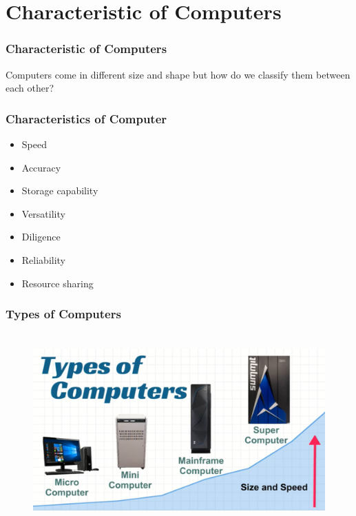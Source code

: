 \section{Characteristic of Computers}
\begin{frame}
	\frametitle{Characteristic of Computers}
		Computers come in different size and shape but how do we classify them between each other?
\frametitle{Characteristics of Computer}
\begin{itemize}
	\item<1-> Speed
	\item<2-> Accuracy
	\item<3-> Storage capability
	\item<4-> Versatility
	\item<5-> Diligence
	\item<6-> Reliability
	\item<7-> Resource sharing
\end{itemize}
\end{frame}

\begin{frame}
\frametitle{Types of Computers}
\begin{figure}
\centering
\includegraphics[width=400pt,height=210pt]{figures/fig2.png}
\label{fig:computers}
\end{figure}	
\end{frame}
